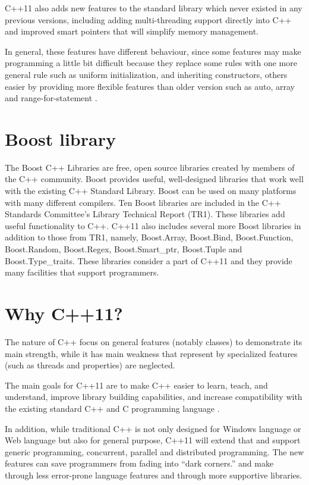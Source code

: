 \documentclass[11pt]{report}
\begin{document}
C++11 also adds new features to the standard library which never existed in any previous versions, including adding multi-threading support directly into C++ and improved smart pointers that will simplify memory management. 

In general, these features have different behaviour, since some features may make programming a little bit difficult because they replace some rules with one more general rule such as uniform initialization,  and inheriting constructors, others easier by providing more flexible features than older version such as auto, array and range-for-statement \cite{Stroustrup:2012:Cpp11}.

	

\section{Boost library}
\label{section: Boost library}
The Boost C++ Libraries are free, open source libraries created by members of the C++ community. Boost provides useful, well-designed libraries that work well with the existing C++ Standard Library. Boost can be used on many platforms with many different compilers. Ten Boost libraries are included in the C++ Standards Committee's Library Technical Report (TR1). These libraries add useful functionality to C++.  C++11 also includes several more Boost libraries in addition to those from TR1, namely, Boost.Array, Boost.Bind, Boost.Function, Boost.Random, Boost.Regex, Boost.Smart\_ptr, Boost.Tuple and Boost.Type\_traits. These libraries consider a part of C++11 and they provide many facilities that support programmers\cite{Deitel:2012:CPP}.


\section{Why C++11?}
\label{secton: Why C++11}
The nature of C++ focus on general features (notably classes) to demonstrate its main strength, while it has main weakness that represent by specialized features (such as threads and properties) are neglected.

The main goals for C++11 are to make C++ easier to learn, teach, and understand, improve library building capabilities, and increase compatibility with the existing standard C++ and C programming language \cite{Deitel:2012:CPP}.

In addition, while traditional C++ is not only designed for Windows language or Web language but also for general purpose, C++11 will extend that and support generic programming, concurrent, parallel and distributed programming. 
The new features can save programmers from fading into “dark corners.” and make through less error-prone language features and through more supportive libraries.
\end{document}
